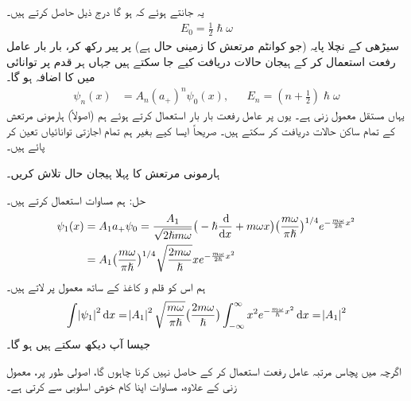  یہ جانتے ہوئے کہ  ہو گا درج ذیل حاصل کرتے ہیں۔
\begin{align}
 E_0 = \frac{1}{2} \hslash \omega 
\end{align}
سیڑھی کے نچلا پایہ (جو کوانٹم مرتعش کا زمینی حال ہے)  پر پیر رکھ کر،   بار بار عامل رفعت استعمال کر کے ہیجان حالات دریافت کیے جا سکتے ہیں جہاں ہر قدم پر توانائی میں  کا اضافہ ہو گا۔
\begin{align}\label{مساوات_شروڈنگر_ہارمونی_حالات}
\psi_n (x) &= A_n ( a_+)^n \psi_0(x) , && E_n = ( n + \tfrac{1}{2}) \hslash \omega
\end{align}
یہاں  مستقل معمول زنی ہے۔ یوں  پر عامل رفعت بار بار استعمال کرتے ہوئے ہم (اصولاً)  ہارمونی مرتعش کے تمام ساکن حالات دریافت کر سکتے ہیں۔ صریحاً ایسا کیے بغیر ہم تمام  اجازتی توانائیاں تعین کر پائے ہیں۔


ہارمونی مرتعش کا پہلا ہیجان حال تلاش کریں۔ 

حل:\quad
 ہم مساوات  استعمال کرتے ہیں۔ 
\begin{gather}
\begin{aligned}\label{مساوات_شروڈنگر_ہارمونی_ہیجان_حالات}
\psi_1 (x) &= A_1 a_+ \psi_0 = \frac{ A_1 }{ \sqrt{ 2 \hslash m \omega } } \big( -\hslash \frac{\dif}{\dif x} + m \omega x\big) \big( \frac{ m \omega}{ \pi \hslash} \big)^{1/4}    e^{-\frac{  m \omega }{ 2 \hslash } x^2}\\
 &= A_1 \big( \frac{ m \omega }{ \pi \hslash}\big)^{1/4} \sqrt{ \frac{ 2 m \omega }{ \hslash} } x e^{-\frac{ m \omega }{ 2 \hslash } x^2}
\end{aligned}
\end{gather}
ہم اس کو قلم و کاغذ کے ساتھ  معمول پر لاتے ہیں۔ 
\begin{align*}
\int \abs{\psi_1}^2 \dif x = \abs{A_1 }^2 \sqrt{ \frac{ m \omega}{ \pi \hslash } } \big( \frac{ 2 m \omega }{ \hslash} \big ) \int_{ - \infty }^{ \infty } x^2  e^{-\frac{ m \omega }{ \hslash } x^2}  \dif x  =  \abs{A_1}^2
\end{align*} 
جیسا آپ دیکھ سکتے ہیں  ہو گا۔
 
اگرچہ میں پچاس مرتبہ عامل رفعت استعمال کر کے   حاصل نہیں کرنا چاہوں گا، اصولی طور پر،   معمول زنی کے علاوہ،  مساوات  اپنا کام خوش اسلوبی سے کرتی ہے۔

